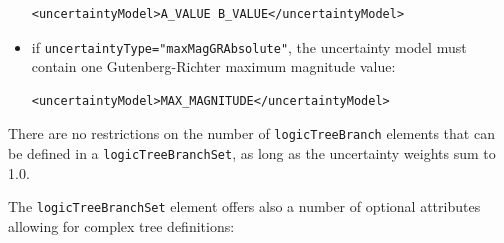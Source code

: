 \begin{itemize}
	\begin{Verbatim}[frame=single, commandchars=\\\{\}, samepage=true]
	<uncertaintyModel>A_VALUE B_VALUE</uncertaintyModel>
	\end{Verbatim}

    \item if \Verb+uncertaintyType="maxMagGRAbsolute"+, the uncertainty
	model must contain one Gutenberg-Richter maximum magnitude value:

	\begin{Verbatim}[frame=single, commandchars=\\\{\}, samepage=true]
	<uncertaintyModel>MAX_MAGNITUDE</uncertaintyModel>
	\end{Verbatim}

\end{itemize}

There are no restrictions on the number of \Verb+logicTreeBranch+ elements
that can be defined in a \Verb+logicTreeBranchSet+, as long as the uncertainty
weights sum to 1.0.

The \Verb+logicTreeBranchSet+ element offers also a number of optional
attributes allowing for complex tree definitions:

